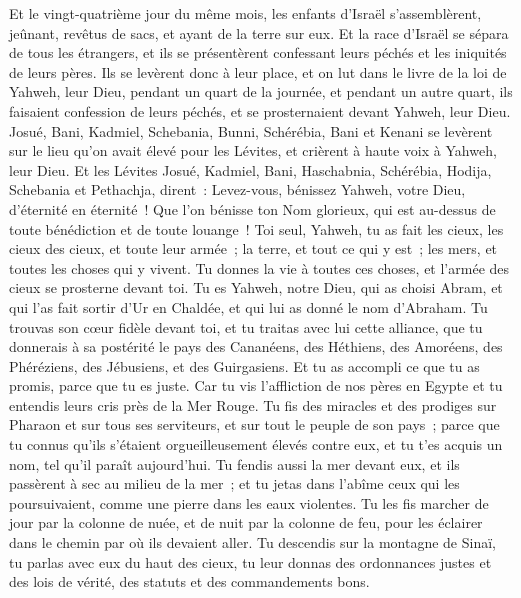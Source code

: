 \begin{multicols}{2}
\VerseOne{}Et le vingt-quatrième jour du même mois, les enfants d'Israël s'assemblèrent, jeûnant, revêtus de sacs, et ayant de la terre sur eux.
Et la race d'Israël se sépara de tous les étrangers, et ils se présentèrent confessant leurs péchés et les iniquités de leurs pères.
Ils se levèrent donc à leur place, et on lut dans le livre de la loi de Yahweh, leur Dieu, pendant un quart de la journée, et pendant un autre quart, ils faisaient confession de leurs péchés, et se prosternaient devant Yahweh, leur Dieu.
Josué, Bani, Kadmiel, Schebania, Bunni, Schérébia, Bani et Kenani se levèrent sur le lieu qu'on avait élevé pour les Lévites, et crièrent à haute voix à Yahweh, leur Dieu.
Et les Lévites Josué, Kadmiel, Bani, Haschabnia, Schérébia, Hodija, Schebania et Pethachja, dirent~: Levez-vous, bénissez Yahweh, votre Dieu, d'éternité en éternité~! Que l'on bénisse ton Nom glorieux, qui est au-dessus de toute bénédiction et de toute louange~!
Toi seul, Yahweh, tu as fait les cieux, les cieux des cieux, et toute leur armée~; la terre, et tout ce qui y est~; les mers, et toutes les choses qui y vivent. Tu donnes la vie à toutes ces choses, et l'armée des cieux se prosterne devant toi.
Tu es Yahweh, notre Dieu, qui as choisi Abram, et qui l'as fait sortir d'Ur en Chaldée, et qui lui as donné le nom d'Abraham.
Tu trouvas son cœur fidèle devant toi, et tu traitas avec lui cette alliance, que tu donnerais à sa postérité le pays des Cananéens, des Héthiens, des Amoréens, des Phéréziens, des Jébusiens, et des Guirgasiens. Et tu as accompli ce que tu as promis, parce que tu es juste.
Car tu vis l'affliction de nos pères en Egypte et tu entendis leurs cris près de la Mer Rouge.
Tu fis des miracles et des prodiges sur Pharaon et sur tous ses serviteurs, et sur tout le peuple de son pays~; parce que tu connus qu'ils s'étaient orgueilleusement élevés contre eux, et tu t'es acquis un nom, tel qu'il paraît aujourd'hui.
Tu fendis aussi la mer devant eux, et ils passèrent à sec au milieu de la mer~; et tu jetas dans l'abîme ceux qui les poursuivaient, comme une pierre dans les eaux violentes.
Tu les fis marcher de jour par la colonne de nuée, et de nuit par la colonne de feu, pour les éclairer dans le chemin par où ils devaient aller.
Tu descendis sur la montagne de Sinaï, tu parlas avec eux du haut des cieux, tu leur donnas des ordonnances justes et des lois de vérité, des statuts et des commandements bons.

\end{multicols}
